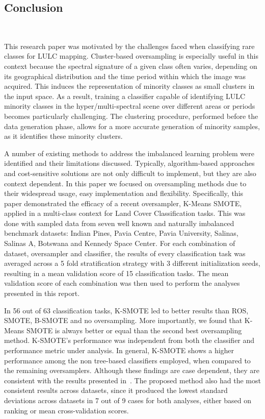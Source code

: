 \documentclass[remotesensing,article,submit,moreauthors,pdftex]{Definitions/mdpi}
\begin{document}
\begin{paracol}{2}
\linenumbers
\switchcolumn

\section{Conclusion}~\label{sec:conclusion} 

This research paper was motivated by the challenges faced when classifying
rare classes for LULC mapping. Cluster-based oversampling is especially
useful in this context because the spectral signature of a given class often
varies, depending on its geographical distribution and the time period within
which the image was acquired. This induces the representation of minority
classes as small clusters in the input space. As a result, training a
classifier capable of identifying LULC minority classes in the
hyper/multi-spectral scene over different areas or periods becomes
particularly challenging. The clustering procedure, performed before the data
generation phase, allows for a more accurate generation of minority samples,
as it identifies these minority clusters.

A number of existing methods to address the imbalanced learning problem were
identified and their limitations discussed. Typically, algorithm-based
approaches and cost-sensitive solutions are not only difficult to implement,
but they are also context dependent. In this paper we focused on oversampling
methods due to their widespread usage, easy implementation and flexibility.
Specifically, this paper demonstrated the efficacy of a recent oversampler,
K-Means SMOTE, applied in a multi-class context for Land Cover Classification
tasks. This was done with sampled data from seven well known and naturally
imbalanced benchmark datasets: Indian Pines, Pavia Centre, Pavia University,
Salinas, Salinas A, Botswana and Kennedy Space Center. For each combination of
dataset, oversampler and classifier, the results of every classification task
was averaged across a 5 fold stratification strategy with 3 different
initialization seeds, resulting in a mean validation score of 15
classification tasks. The mean validation score of each combination was then
used to perform the analyses presented in this report.

In 56 out of 63 classification tasks, K-SMOTE led to better results than ROS,
SMOTE, B-SMOTE and no oversampling. More importantly, we found that K-Means
SMOTE is always better or equal than the second best oversampling method.
K-SMOTE's performance was independent from both the classifier and performance
metric under analysis. In general, K-SMOTE shows a higher performance among
the non tree-based classifiers employed, when compared to the remaining
oversamplers. Although these findings are case dependent, they are consistent
with the results presented in~\cite{Douzas2018}. The proposed method also had
the most consistent results across datasets, since it produced the lowest
standard deviations across datasets in 7 out of 9 cases for both analyses,
either based on ranking or mean cross-validation scores.


\end{paracol}
\end{document}
